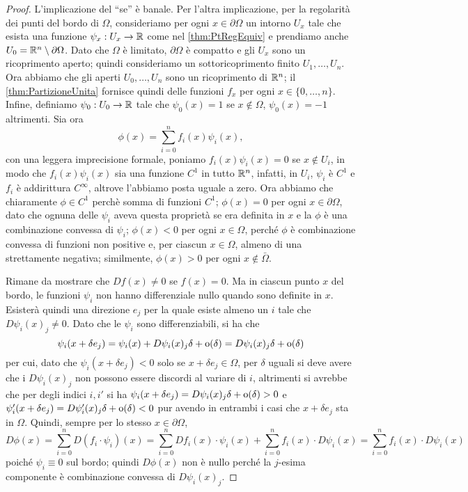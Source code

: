 \begin{proof}
	L'implicazione del ``se'' è banale. Per l'altra implicazione, per la regolarità dei punti del bordo di $\Omega$, consideriamo per ogni
	$x\in\partial \Omega$ un intorno $U_x$ tale che esista una funzione $\psi_x:U_x\rightarrow \mathbb R$ come nel \cref{thm:PtRegEquiv} e prendiamo
	anche $U_0 = \mathbb R^n \setminus \partial \Omega$. Dato che $\Omega$ è limitato, $\partial\Omega$ è compatto e gli $U_x$ sono un ricoprimento
	aperto; quindi consideriamo un sottoricoprimento finito $U_1, \dots, U_n$. Ora abbiamo che gli aperti $U_0,\dots,U_n$ sono un ricoprimento
	di $\mathbb R^n$; il \cref{thm:PartizioneUnita} fornisce quindi delle funzioni $f_x$ per ogni $x\in\{0,\dots, n\}$.
	Infine, definiamo $\psi_0:U_0\rightarrow \mathbb R$ tale che $\psi_0(x)=1$ se $x\notin \Omega$, $\psi_0(x)=-1$ altrimenti. Sia ora 
	\[
		\phi(x)=\sum_{i=0}^n f_i(x) \psi_i(x),
	\]
	con una leggera imprecisione formale, poniamo $f_i(x) \psi_i(x) = 0$ se $x\notin U_i$, in modo che $f_i(x) \psi_i(x)$ sia una funzione
	$C^1$ in tutto $\mathbb R^n$, infatti, in $U_i$, $\psi_i$ è $C^1$ e $f_i$ è addirittura $C^{\infty}$, altrove l'abbiamo posta uguale a zero.
	Ora abbiamo che chiaramente $\phi\in C^1$ perchè somma di funzioni $C^1$; $\phi(x)=0$ per ogni $x\in \partial\Omega$, dato che ognuna delle
	$\psi_i$ aveva questa proprietà se era definita in $x$ e la $\phi$ è una combinazione convessa di $\psi_i$;
	$\phi(x)<0$ per ogni $x \in \Omega$, perché $\phi$ è combinazione convessa di funzioni non positive e, per ciascun $x \in \Omega$,
	almeno di una strettamente negativa; similmente, $\phi(x)>0$ per ogni $x \notin \bar{\Omega}$.
	
	Rimane da mostrare che $Df(x)\neq 0$ se $f(x)=0$. Ma in ciascun punto $x$ del bordo, le funzioni $\psi_i$ non hanno differenziale nullo quando
	sono definite in $x$. Esisterà quindi una direzione $e_j$ per la quale esiste almeno un $i$ tale che $D\psi_i(x)_j\neq 0$. Dato che le $\psi_i$
	sono differenziabili, si ha che
	\[
		\psi_i(x+\delta e_j)=\psi_i(x)+D\psi_i(x)_j \delta + \mathrm{o}(\delta) = D\psi_i(x)_j \delta + \mathrm{o}(\delta)
	\]
	per cui, dato che $\psi_i(x+\delta e_j)<0$ solo se $x+\delta e_j\in \Omega$, per $\delta$ uguali si deve avere che i $D\psi_i(x)_j$ non possono
	essere discordi al variare di $i$, altrimenti si avrebbe che per degli indici $i,i'$ si ha $\psi_i(x+\delta e_j)=
	D\psi_i(x)_j \delta + \mathrm{o}(\delta)>0$ e $\psi_i'(x+\delta e_j)=D\psi_i'(x)_j \delta + \mathrm{o}(\delta)<0$ pur avendo in entrambi i casi
	che $x+\delta e_j$ sta in $\Omega$. Quindi, sempre per lo stesso $x\in\partial \Omega$,
	\[ 
		D\phi(x)=\sum_{i=0}^n D(f_i \cdot\psi_i)(x)=\sum_{i=0}^n Df_i(x)\cdot \psi_i(x)+\sum_{i=0}^n f_i(x)\cdot D \psi_i(x)=
		\sum_{i=0}^n f_i(x)\cdot D \psi_i(x)
	\]
	poiché $\psi_i\equiv 0$ sul bordo; quindi $D\phi(x)$ non è nullo perché la $j$-esima componente è combinazione convessa di $D\psi_i(x)_j$.
\end{proof}

